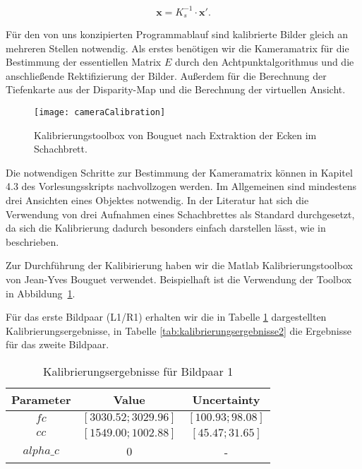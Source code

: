 \begin{equation}
  \label{eq:pixel_bildkoordianten}
\mathbf{x} = K_s^{-1} \cdot \mathbf{x'}.
\end{equation}

Für den von uns konzipierten Programmablauf sind kalibrierte Bilder gleich an mehreren Stellen notwendig. Als erstes benötigen wir die Kameramatrix für die Bestimmung der essentiellen Matrix $E$ durch den Achtpunktalgorithmus und die anschließende Rektifizierung der Bilder. Außerdem für die Berechnung der Tiefenkarte aus der Disparity-Map und die Berechnung der virtuellen Ansicht.

\begin{figure}[!hp]
	\centering
	\texttt{[image: cameraCalibration]}
	\caption{Kalibrierungstoolbox von Bouguet nach Extraktion der Ecken im Schachbrett.}
	\label{fig:kalibrierungstoolbox}
\end{figure}

Die notwendigen Schritte zur Bestimmung der Kameramatrix können in Kapitel 4.3 des Vorlesungsskripts nachvollzogen werden. Im Allgemeinen sind mindestens drei Ansichten eines Objektes notwendig. In der Literatur hat sich die Verwendung von drei Aufnahmen eines Schachbrettes als Standard durchgesetzt, da sich die Kalibrierung dadurch besonders einfach darstellen lässt, wie in \cite[Kapitel 6.5.3]{Ma} beschrieben.

Zur Durchführung der Kalibirierung haben wir die Matlab Kalibrierungstoolbox von Jean-Yves Bouguet \cite{Bouguet} verwendet. Beispielhaft ist die Verwendung der Toolbox in Abbildung~\ref{fig:kalibrierungstoolbox}.

Für das erste Bildpaar (L1/R1) erhalten wir die in Tabelle \ref{tab:kalibrierungsergebnisse1} dargestellten Kalibrierungsergebnisse, in Tabelle \ref{tab:kalibrierungsergebnisse2} die Ergebnisse für das zweite Bildpaar.

\begin{table}[htbp]
\begin{center} 
\begin{tabular}{c|c|c}
Parameter & Value                                     & Uncertainty       \\ \hline
$fc$      & $[3030.52; 3029.96]$                      & $[100.93; 98.08]$ \\ \hline
$cc$      & $[1549.00; 1002.88]$ & $[45.47; 31.65]$ \\ \hline
$alpha\_c$ & $0$                  & -                
\end{tabular}
\caption{Kalibrierungsergebnisse für Bildpaar 1} 
\end{center}
\label{tab:kalibrierungsergebnisse1} 
\end{table}

